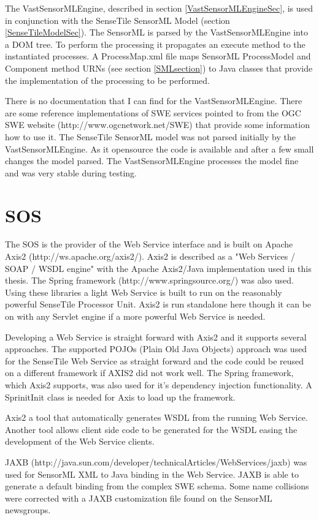 \documentclass[]{final_report}
\begin{document}
The VastSensorMLEngine, described in section \ref{VastSensorMLEngineSec}, is used in conjunction with the SenseTile SensorML Model (section \ref{SenseTileModelSec}). The SensorML is parsed by the VastSensorMLEngine into a DOM tree. To perform the processing it propagates an execute method to the instantiated processes. A ProcessMap.xml file maps SensorML ProcessModel and Component method  URNs  (see section \ref{SMLsection}) to Java classes that provide the implementation of the processing to be performed. 

There is no documentation that I can find for the VastSensorMLEngine. There are some reference implementations of SWE services pointed to from the OGC SWE website (http://www.ogcnetwork.net/SWE) that provide some information how to use it. The SenseTile SensorML model was not parsed initially by the VastSensorMLEngine. As it opensource the code is available and after a few small changes the model parsed. The VastSensorMLEngine processes the model fine and was very stable during testing.


\section{SOS}
The SOS is the provider of the Web Service interface and is built on Apache Axis2 (http://ws.apache.org/axis2/). 
Axis2 is described as a "Web Services / SOAP / WSDL engine"  with the Apache Axis2/Java implementation used in this thesis. The Spring framework (http://www.springsource.org/) was also used. Using these libraries a light Web Service is built to run on the reasonably powerful SenseTile Processor Unit. Axis2 is run standalone here though it can be on with any Servlet engine if a more powerful Web Service is needed.

Developing a Web Service is straight forward with Axis2 and it supports several approaches. The supported POJOs (Plain Old Java Objects) approach was used for the SenseTile Web Service as straight forward and the code could be reused on a different framework if AXIS2 did not work well. The Spring framework, which Axis2 supports, was also used for it's dependency injection functionality. A SprinitInit class is needed for Axis to load up the framework.

Axis2 a tool that automatically generates WSDL from the running Web Service. Another tool allows client side code to be generated for the WSDL easing the development of the Web Service clients.

JAXB (http://java.sun.com/developer/technicalArticles/WebServices/jaxb) was used for SensorML XML to Java binding in the Web Service. JAXB is able to generate a default binding from the complex SWE schema. Some name collisions were corrected with a JAXB customization file found on the SensorML newsgroups.
\end{document}
